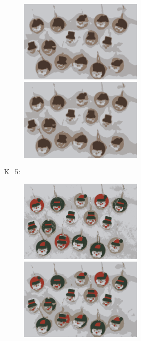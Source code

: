 \begin{center}
\begin{figure}[H]
\centering\includegraphics[width=6cm]{./imgkmeanscluster04-04.png}
\centering\includegraphics[width=6cm]{./imgkmeanscluster04-05.png}\\
\end{figure}
\end{center}
K=5:\\
\begin{center}
\begin{figure}[H]
\centering\includegraphics[width=6cm]{./imgkmeanscluster05-00.png}
\centering\includegraphics[width=6cm]{./imgkmeanscluster05-01.png}\\
\end{figure}
\end{center}
